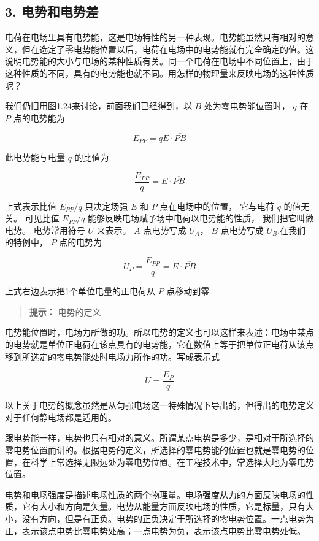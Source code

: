 \subsection{3. 电势和电势差}\label{ux7535ux52bfux548cux7535ux52bfux5dee}

电荷在电场里具有电势能，这是电场特性的另一种表现。电势能虽然只有相对的意义，但在选定了零电势能位置以后，电荷在电场中的电势能就有完全确定的值。这说明电势能的大小与电场的某种性质有关。同一个电荷在电场中不同位置上，由于这种性质的不同，具有的电势能也就不同。用怎样的物理量来反映电场的这种性质呢？

我们仍旧用图1.24来讨论，前面我们已经得到，以 \(B\) 处为零电势能位置时，
\(q\) 在 \(P\) 点的电势能为

\[
E_{P P} = q E \cdot \overline {{P B}}
\]

此电势能与电量 \(q\) 的比值为

\[
\frac{E_{P P}}{q} = E \cdot \overline {{P B}}
\]

上式表示比值 \(E_{PP} / q\) 只决定场强 \(E\) 和 \(P\) 点在电场中的位置，
它与电荷 \(q\) 的值无关。 可见比值 \(E_{PP} / q\)
能够反映电场赋予场中电荷以电势能的性质， 我们把它叫做电势。 电势常用符号
\(U\) 来表示。 \(A\) 点电势写成 \(U_A\)， \(B\) 点电势写成
\(U_B\).在我们的特例中， \(P\) 点的电势为

\[
U_{P} = \frac{E_{P P}}{q} = E \cdot \overline {{P B}}
\]

上式右边表示把1个单位电量的正电荷从 \(P\) 点移动到零

\begin{quote}
\textbf{提示：} 电势的定义
\end{quote}

电势能位置时，电场力所做的功。所以电势的定义也可以这样来表述：电场中某点的电势就是单位正电荷在该点具有的电势能，它在数值上等于把单位正电荷从该点移到所选定的零电势能处时电场力所作的功。写成表示式

\[
U = \frac{E_{P}}{q} \tag{1.5}
\]

以上关于电势的概念虽然是从匀强电场这一特殊情况下导出的，但得出的电势定义对于任何静电场都是适用的。

跟电势能一样，电势也只有相对的意义。所谓某点电势是多少，是相对于所选择的零电势位置而讲的。根据电势的定义，所选择的零电势能的位置也就是零电势的位置，在科学上常选择无限远处为零电势位置。在工程技术中，常选择大地为零电势位置。

电势和电场强度是描述电场性质的两个物理量。电场强度从力的方面反映电场的性质，它有大小和方向是矢量。电势从能量方面反映电场的性质，它是标量，只有大小，没有方向，但是有正负。电势的正负决定于所选择的零电势位置。一点电势为正，表示该点电势比零电势处高；一点电势为负，表示该点电势比零电势处低。

